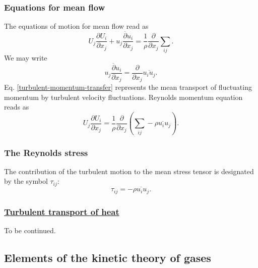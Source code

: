 \documentclass[review]{elsarticle}
\begin{document}
	\subsubsection{Equations for mean flow}
		The equations of motion for mean flow read as
		\begin{equation}
			U_j\frac{\partial U_i}{\partial x_j} + \overline{u_j\frac{\partial u_i}{\partial x_j}} = \frac{1}{\rho}\frac{\partial}{\partial x_j}{\sum}_{ij}.
		\end{equation}
		We may write 
		\begin{equation}\label{turbulent-momentum-transfer}
			\overline{u_j\frac{\partial u_i}{\partial x_j}} = \frac{\partial}{\partial x_j}\overline{u_iu_j}.
		\end{equation}
		Eq. \ref{turbulent-momentum-transfer} represents the mean transport of fluctuating momentum by turbulent velocity fluctuations.
		Reynolds momentum equation reads as
		\begin{equation} \label{ReMomEq}
			U_j\frac{\partial U_i}{\partial x_j} = \frac{1}{\rho}\frac{\partial}{\partial x_j}({\sum}_{ij} - \overline{\rho u_iu_j}).
		\end{equation}
	\subsubsection{The Reynolds stress}
		The contribution of the turbulent motion to the mean stress tensor is designated by the symbol $\tau_{ij}$:
		\begin{equation}
			\tau_{ij} = - \overline{\rho u_iu_j}.
		\end{equation}
	\subsubsection{\underline{Turbulent transport of heat}}
		To be continued.
	\subsection{Elements of the kinetic theory of gases}
\end{document}
